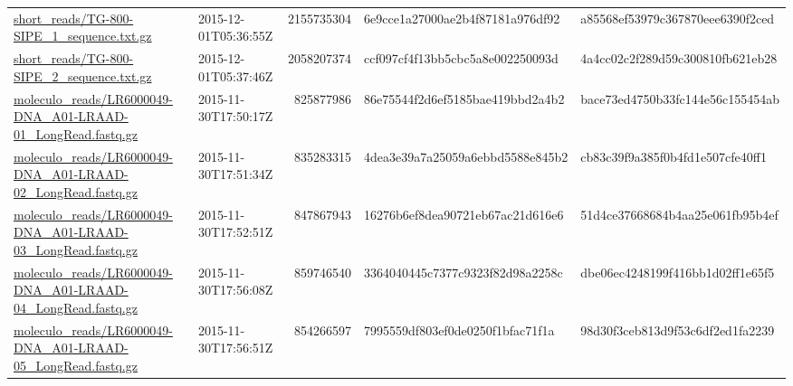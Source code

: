 \documentclass[12pt,a4paper]{scrartcl}
\begin{document}
\begin{table}
\begin{tabularx}{\linewidth}{>{\ttfamily\tiny}X>{\ttfamily\tiny}l>{\ttfamily\tiny}r*{2}{>{\ttfamily\tiny}l}}
\href{http://weatherby.genetics.utah.edu/seq_transf/short_reads/TG-800-SIPE_1_sequence.txt.gz}{short\_reads/TG-800-SIPE\_1\_sequence.txt.gz}
                                                               & 2015-12-01T05:36:55Z &  \num{2155735304} & 6e9cce1a27000ae2b4f87181a976df92 & a85568ef53979c367870eee6390f2ced \\
\href{http://weatherby.genetics.utah.edu/seq_transf/short_reads/TG-800-SIPE_2_sequence.txt.gz}{short\_reads/TG-800-SIPE\_2\_sequence.txt.gz}
                                                               & 2015-12-01T05:37:46Z &  \num{2058207374} & ccf097cf4f13bb5cbc5a8e002250093d & 4a4cc02c2f289d59c300810fb621eb28 \\
\href{http://weatherby.genetics.utah.edu/seq_transf/moleculo_reads/LR6000049-DNA_A01-LRAAD-01_LongRead.fastq.gz}{moleculo\_reads/LR6000049-DNA\_A01-LRAAD-01\_LongRead.fastq.gz}
                                                               & 2015-11-30T17:50:17Z &   \num{825877986} & 86e75544f2d6ef5185bae419bbd2a4b2 & bace73ed4750b33fc144e56c155454ab \\
\href{http://weatherby.genetics.utah.edu/seq_transf/moleculo_reads/LR6000049-DNA_A01-LRAAD-02_LongRead.fastq.gz}{moleculo\_reads/LR6000049-DNA\_A01-LRAAD-02\_LongRead.fastq.gz}
                                                               & 2015-11-30T17:51:34Z &   \num{835283315} & 4dea3e39a7a25059a6ebbd5588e845b2 & cb83c39f9a385f0b4fd1e507cfe40ff1 \\
\href{http://weatherby.genetics.utah.edu/seq_transf/moleculo_reads/LR6000049-DNA_A01-LRAAD-03_LongRead.fastq.gz}{moleculo\_reads/LR6000049-DNA\_A01-LRAAD-03\_LongRead.fastq.gz}
                                                               & 2015-11-30T17:52:51Z &   \num{847867943} & 16276b6ef8dea90721eb67ac21d616e6 & 51d4ce37668684b4aa25e061fb95b4ef \\
\href{http://weatherby.genetics.utah.edu/seq_transf/moleculo_reads/LR6000049-DNA_A01-LRAAD-04_LongRead.fastq.gz}{moleculo\_reads/LR6000049-DNA\_A01-LRAAD-04\_LongRead.fastq.gz}
                                                               & 2015-11-30T17:56:08Z &   \num{859746540} & 3364040445c7377c9323f82d98a2258c & dbe06ec4248199f416bb1d02ff1e65f5 \\
\href{http://weatherby.genetics.utah.edu/seq_transf/moleculo_reads/LR6000049-DNA_A01-LRAAD-05_LongRead.fastq.gz}{moleculo\_reads/LR6000049-DNA\_A01-LRAAD-05\_LongRead.fastq.gz}
                                                               & 2015-11-30T17:56:51Z &   \num{854266597} & 7995559df803ef0de0250f1bfac71f1a & 98d30f3ceb813d9f53c6df2ed1fa2239 \\
\end{tabularx}
\end{table}
\end{document}
